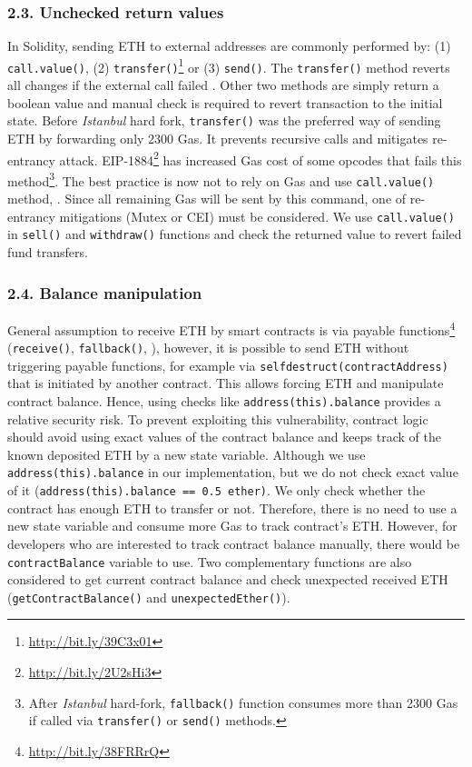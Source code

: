 \subsubsection*{2.3. Unchecked return values}
In Solidity, sending ETH to external addresses are commonly performed by: (1) \texttt{call.value()}, (2) \texttt{transfer()}\footnote{\url{http://bit.ly/39C3x01}} or (3) \texttt{send()}. The \texttt{transfer()} method reverts all changes if the external call failed \cite{SoliditySendEther}. Other two methods are simply return a boolean value and manual check is required to revert transaction to the initial state. Before \textit{Istanbul} hard fork\cite{IstanbulUpgrades}, \texttt{transfer()} was the preferred way of sending ETH by forwarding only 2300 Gas. It prevents recursive calls and mitigates re-entrancy attack. EIP-1884\footnote{\url{http://bit.ly/2U2sHi3}} has increased Gas cost of some opcodes that fails this method\footnote{After \textit{Istanbul} hard-fork, \texttt{fallback()} function consumes more than 2300 Gas if called via \texttt{transfer()} or \texttt{send()} methods.}. The best practice is now not to rely on Gas and use \texttt{call.value()} method\cite{ConsensysStopTran}, \cite{ChainSecurity}. Since all remaining Gas will be sent by this command, one of re-entrancy mitigations (\ie Mutex or CEI) must be considered. We use \texttt{call.value()} in \texttt{sell()} and \texttt{withdraw()} functions and check the returned value to revert failed fund transfers.

\subsubsection*{2.4. Balance manipulation}
General assumption to receive ETH by smart contracts is via payable functions\footnote{\url{http://bit.ly/38FRRrQ}} (\ie \texttt{receive()}, \texttt{fallback()}, \etc), however, it is possible to send ETH without triggering payable functions, for example via \texttt{selfdestruct(contractAddress)} that is initiated by another contract. This allows forcing ETH and manipulate contract balance\cite{UnexpectedEth}. Hence, using checks like \texttt{address(this).balance} provides a relative security risk. To prevent exploiting this vulnerability, contract logic should avoid using exact values of the contract balance and keeps track of the known deposited ETH by a new state variable. Although we use \texttt{address(this).balance} in our implementation, but we do not check exact value of it (\ie  \texttt{address(this).balance == 0.5 ether)}. We only check whether the contract has enough ETH to transfer or not. Therefore, there is no need to use a new state variable and consume more Gas to track contract's ETH. However, for developers who are interested to track contract balance manually, there would be \texttt{contractBalance} variable to use. Two complementary functions are also considered to get current contract balance and check unexpected received ETH (\ie \texttt{getContractBalance()} and \texttt{unexpectedEther()}).

